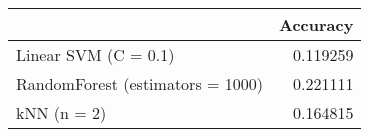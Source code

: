 \begin{tabular}{lr}
\toprule
{} &  Accuracy \\
\midrule
Linear SVM (C = 0.1)             &  0.119259 \\
RandomForest (estimators = 1000) &  0.221111 \\
kNN (n = 2)                      &  0.164815 \\
\bottomrule
\end{tabular}
